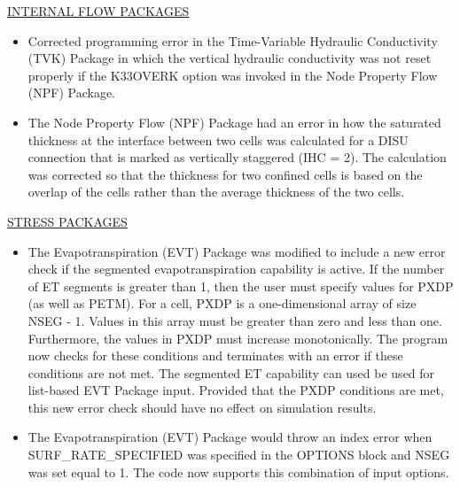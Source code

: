 \documentclass[11pt,twoside,twocolumn]{usgsreport}
\begin{document}
\begin{itemize}
	\underline{INTERNAL FLOW PACKAGES}
	\begin{itemize}
		\item Corrected programming error in the Time-Variable Hydraulic Conductivity (TVK) Package in which the vertical hydraulic conductivity was not reset properly if the K33OVERK option was invoked in the Node Property Flow (NPF) Package.
		\item The Node Property Flow (NPF) Package had an error in how the saturated thickness at the interface between two cells was calculated for a DISU connection that is marked as vertically staggered (IHC = 2).  The calculation was corrected so that the thickness for two confined cells is based on the overlap of the cells rather than the average thickness of the two cells.
	\end{itemize}

	\underline{STRESS PACKAGES}
	\begin{itemize}
		\item The Evapotranspiration (EVT) Package was modified to include a new error check if the segmented evapotranspiration capability is active.  If the number of ET segments is greater than 1, then the user must specify values for PXDP (as well as PETM).  For a cell, PXDP is a one-dimensional array of size NSEG - 1.  Values in this array must be greater than zero and less than one.  Furthermore, the values in PXDP must increase monotonically.  The program now checks for these conditions and terminates with an error if these conditions are not met.  The segmented ET capability can used be used for list-based EVT Package input.  Provided that the PXDP conditions are met, this new error check should have no effect on simulation results.
		\item The Evapotranspiration (EVT) Package would throw an index error when SURF\_RATE\_SPECIFIED was specified in the OPTIONS block and NSEG was set equal to 1.  The code now supports this combination of input options.
	\end{itemize}


\end{itemize}
\end{document}
